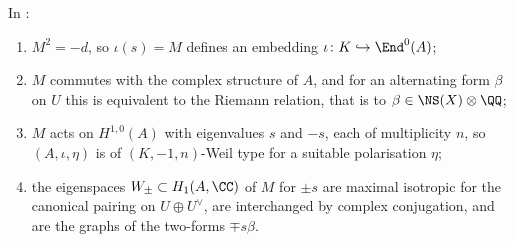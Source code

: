 \begin{theorem}\label{thm:explicitweil}
In :
\begin{enumerate}[label=\textup{(\roman*)}]
\item $M^{2}=-d$, so $\iota(s)=M$ defines an embedding
  $\iota\colon K\hookrightarrow\End^{0}(A)$;
\item $M$ commutes with the complex structure of $A$, and for an
  alternating form $\beta$ on $U$ this is equivalent to the Riemann relation,
  that is to $\beta\in\NS(X)\otimes\QQ$;
\item $M$ acts on $H^{1,0}(A)$ with eigenvalues $s$ and $-s$, each of
  multiplicity $n$, so $(A,\iota,\eta)$ is of $(K,-1,n)$-Weil type for a
  suitable polarisation $\eta$;
\item the eigenspaces $W_{\pm}\subset H_{1}(A,\CC)$ of $M$ for $\pm s$ are
  maximal isotropic for the canonical pairing on $U\oplus U^{\vee}$, are
  interchanged by complex conjugation, and are the graphs of the two-forms
  $\mp s\beta$.
\end{enumerate}
\end{theorem}

